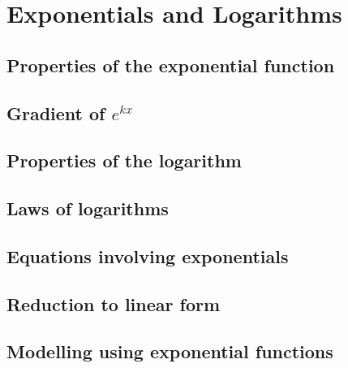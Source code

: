 \chapter{Exponentials and Logarithms}

\section{Properties of the exponential function}

\section{Gradient of \(e^{kx}\)} %
\section{Properties of the logarithm}
\section{Laws of logarithms}
\section{Equations involving exponentials}
\section{Reduction to linear form}
\section{Modelling using exponential functions}

